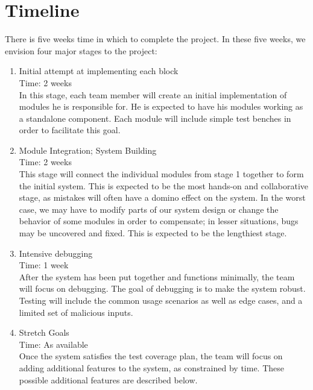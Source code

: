 \documentclass{article}
\begin{document}
\section{Timeline}
There is five weeks time in which to complete the project. In these five weeks, we envision four major stages to the project:
\begin{enumerate}
	\item Initial attempt at implementing each block \hfill \\
		Time: 2 weeks \hfill \\
		In this stage, each team member will create an initial implementation of modules he is responsible for. He is expected to have his modules working as a standalone component. Each module will include simple test benches in order to facilitate this goal.
	\item Module Integration; System Building \hfill \\
		Time: 2 weeks \hfill \\
		This stage will connect the individual modules from stage 1 together to form the initial system. This is expected to be the most hands-on and collaborative stage, as mistakes will often have a domino effect on the system. In the worst case, we may have to modify parts of our system design or change the behavior of some modules in order to compensate; in lesser situations, bugs may be uncovered and fixed. This is expected to be the lengthiest stage.
	\item Intensive debugging \hfill \\
		Time: 1 week \hfill \\
		After the system has been put together and functions minimally, the team will focus on debugging. The goal of debugging is to make the system robust. Testing will include the common usage scenarios as well as edge cases, and a limited set of malicious inputs.
	\item Stretch Goals \hfill \\
		Time: As available \hfill \\
		Once the system satisfies the test coverage plan, the team will focus on adding additional features to the system, as constrained by time. These possible additional features are described below.

\end{enumerate}
\end{document}
